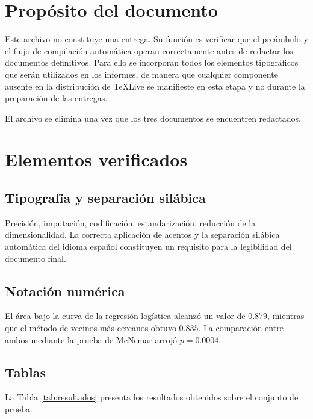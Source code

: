\documentclass[11pt]{article}
\begin{document}

\tableofcontents
\newpage

\section{Propósito del documento}

Este archivo no constituye una entrega. Su función es verificar que el preámbulo y el flujo de
compilación automática operan correctamente antes de redactar los documentos definitivos. Para
ello se incorporan todos los elementos tipográficos que serán utilizados en los informes, de
manera que cualquier componente ausente en la distribución de \TeX Live se manifieste en esta
etapa y no durante la preparación de las entregas.

El archivo se elimina una vez que los tres documentos se encuentren redactados.

\section{Elementos verificados}

\subsection{Tipografía y separación silábica}

Precisión, imputación, codificación, estandarización, reducción de la dimensionalidad.
La correcta aplicación de acentos y la separación silábica automática del idioma español
constituyen un requisito para la legibilidad del documento final.

\subsection{Notación numérica}

El área bajo la curva de la regresión logística alcanzó un valor de $0.879$, mientras que el
método de vecinos más cercanos obtuvo $0.835$. La comparación entre ambos mediante la prueba
de McNemar arrojó $p = 0.0004$.

\subsection{Tablas}

La Tabla \ref{tab:resultados} presenta los resultados obtenidos sobre el conjunto de prueba.
\end{document}
